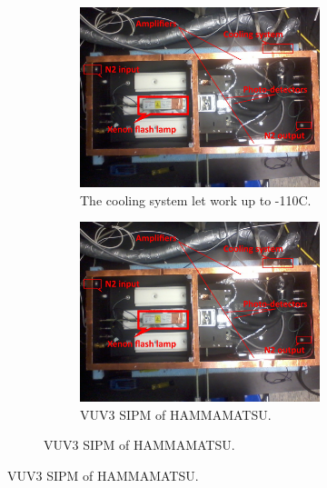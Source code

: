 \begin{figure}[!hbtp]
  \begin{figure}[!hbtp]
  \centering
  \begin{subfigure}{.5\textwidth}
    \includegraphics[totalheight=.35\textwidth,trim=0cm 7cm 0cm 2.5cm, clip=true,]{../Pictures/blabla/box.jpg}%
    \caption{The cooling system let work up to -110C.}
    \label{fig:beam_splitter}
  \end{subfigure}%
  \begin{subfigure}{.5\textwidth}
    \includegraphics[totalheight=.35\textwidth,trim=0cm 7cm 0cm 2.5cm, clip=true,]{../Pictures/blabla/box.jpg}
    \caption{ VUV3 SIPM of HAMMAMATSU.}
    \label{fig:cooing system}
  \end{subfigure}
  \end{figure}  
  

\end{figure}
